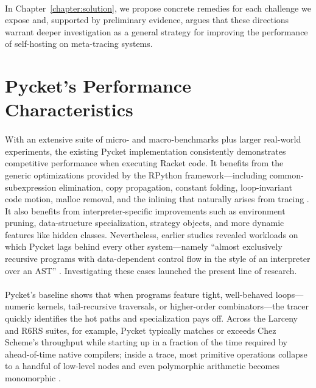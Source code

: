 	\paragraph{}%
		In Chapter~\ref{chapter:solution}, we propose concrete remedies for each challenge we expose and, supported by preliminary evidence, argues that these directions warrant deeper investigation as a general strategy for improving the performance of self-hosting on meta-tracing systems.

	\section[\texorpdfstring{Pycket's Performance Characteristics}{Pycket's Performance}]{Pycket's Performance Characteristics}
	\label{section:pycket-performance-characteristics}


	\paragraph{}%
		With an extensive suite of micro- and macro-benchmarks plus larger real-world experiments, the existing Pycket implementation consistently demonstrates competitive performance when executing Racket code. It benefits from the generic optimizations provided by the RPython framework—including common-subexpression elimination, copy propagation, constant folding, loop-invariant code motion, malloc removal, and the inlining that naturally arises from tracing \cite{loop-aware:12,hotpath:06,malloc-removal:11}. It also benefits from interpreter-specific improvements such as environment pruning, data-structure specialization, strategy objects, and more dynamic features like hidden classes. Nevertheless, earlier studies revealed workloads on which Pycket lags behind every other system—namely “almost exclusively recursive programs with data-dependent control flow in the style of an interpreter over an AST” \cite{pycketmain,pycketmain2}. Investigating these cases launched the present line of research.

	\paragraph{}%
		Pycket's baseline shows that when programs feature tight, well-behaved loops—numeric kernels, tail-recursive traversals, or higher-order combinators—the tracer quickly identifies the hot paths and specialization pays off. Across the Larceny and R6RS suites, for example, Pycket typically matches or exceeds Chez Scheme's throughput while starting up in a fraction of the time required by ahead-of-time native compilers; inside a trace, most primitive operations collapse to a handful of low-level nodes and even polymorphic arithmetic becomes monomorphic \cite{pycketmain2}.

